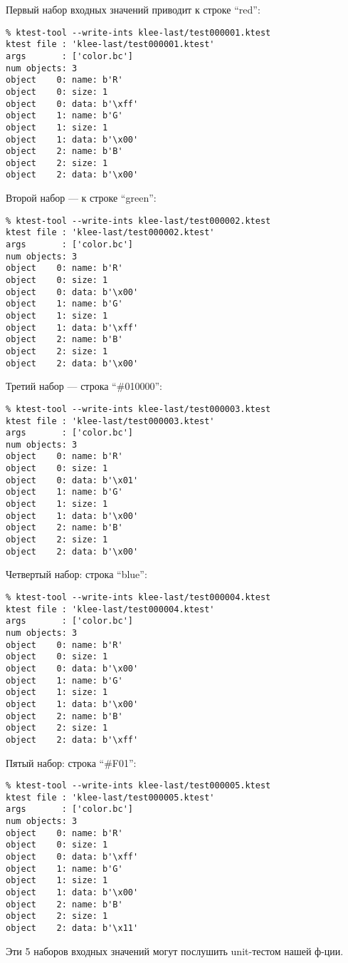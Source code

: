 Первый набор входных значений приводит к строке ``red'':

\begin{lstlisting}
% ktest-tool --write-ints klee-last/test000001.ktest
ktest file : 'klee-last/test000001.ktest'
args       : ['color.bc']
num objects: 3
object    0: name: b'R'
object    0: size: 1
object    0: data: b'\xff'
object    1: name: b'G'
object    1: size: 1
object    1: data: b'\x00'
object    2: name: b'B'
object    2: size: 1
object    2: data: b'\x00'
\end{lstlisting}

Второй набор --- к строке ``green'':

\begin{lstlisting}
% ktest-tool --write-ints klee-last/test000002.ktest
ktest file : 'klee-last/test000002.ktest'
args       : ['color.bc']
num objects: 3
object    0: name: b'R'
object    0: size: 1
object    0: data: b'\x00'
object    1: name: b'G'
object    1: size: 1
object    1: data: b'\xff'
object    2: name: b'B'
object    2: size: 1
object    2: data: b'\x00'
\end{lstlisting}

Третий набор --- строка ``\#010000'':

\begin{lstlisting}
% ktest-tool --write-ints klee-last/test000003.ktest
ktest file : 'klee-last/test000003.ktest'
args       : ['color.bc']
num objects: 3
object    0: name: b'R'
object    0: size: 1
object    0: data: b'\x01'
object    1: name: b'G'
object    1: size: 1
object    1: data: b'\x00'
object    2: name: b'B'
object    2: size: 1
object    2: data: b'\x00'
\end{lstlisting}

Четвертый набор: строка ``blue'':

\begin{lstlisting}
% ktest-tool --write-ints klee-last/test000004.ktest
ktest file : 'klee-last/test000004.ktest'
args       : ['color.bc']
num objects: 3
object    0: name: b'R'
object    0: size: 1
object    0: data: b'\x00'
object    1: name: b'G'
object    1: size: 1
object    1: data: b'\x00'
object    2: name: b'B'
object    2: size: 1
object    2: data: b'\xff'
\end{lstlisting}

Пятый набор: строка ``\#F01'':

\begin{lstlisting}
% ktest-tool --write-ints klee-last/test000005.ktest
ktest file : 'klee-last/test000005.ktest'
args       : ['color.bc']
num objects: 3
object    0: name: b'R'
object    0: size: 1
object    0: data: b'\xff'
object    1: name: b'G'
object    1: size: 1
object    1: data: b'\x00'
object    2: name: b'B'
object    2: size: 1
object    2: data: b'\x11'
\end{lstlisting}

Эти 5 наборов входных значений могут послушить unit-тестом нашей ф-ции.

